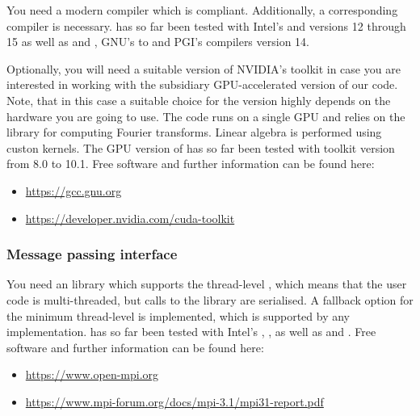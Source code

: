 \documentclass[a4paper, 11pt, DIV=11]{scrartcl}
\begin{document}
You need a modern \href{https://en.wikipedia.org/wiki/Fortran}{\fortran} compiler
which is \href{https://en.wikipedia.org/wiki/OpenMP}{} compliant.
Additionally, a corresponding \href{https://en.wikipedia.org/wiki/C_(programming_language)}{}
compiler is necessary. \nsc has so far been tested with Intel's  and 
 versions 12 through 15 as well as  and ,
GNU's  to  and PGI's compilers version 14.
\par
Optionally, you will need a suitable version of NVIDIA's
\href{https://en.wikipedia.org/wiki/CUDA}{\cuda} toolkit in case you are interested
in working with the subsidiary GPU-accelerated version of our code.
Note, that in this case a suitable choice for the \cuda version highly depends on
the hardware you are going to use. The code runs on a single GPU and relies on the
 library for computing Fourier transforms. Linear algebra is performed
using custon  kernels. The GPU version of \nsc has so far been tested with
\cuda toolkit version from 8.0 to 10.1. Free software and further information can be found here:
\begin{itemize}
\item \url{https://gcc.gnu.org}
\item \url{https://developer.nvidia.com/cuda-toolkit}
\end{itemize}

\subsubsection{Message passing interface}
\label{sec:mpi}

You need an \href{https://en.wikipedia.org/wiki/Message_Passing_Interface}{\mpi} library which supports the thread-level ,
which means that the user code is multi-threaded, but calls to the  library are serialised. A fallback option for the minimum thread-level is implemented, which is supported by any \mpi implementation. \nsc has so far been tested with Intel's , ,
 as well as  and . Free software and further information can be found here:
\begin{itemize}
\item \url{https://www.open-mpi.org}
\item \url{https://www.mpi-forum.org/docs/mpi-3.1/mpi31-report.pdf}
\end{itemize}
\end{document}
